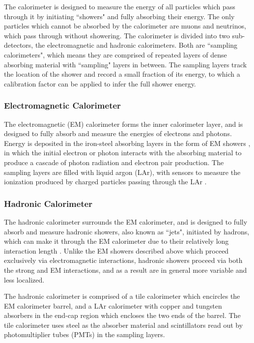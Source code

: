 \documentclass[12pt]{article}
\begin{document}
The calorimeter is designed to measure the energy of all particles which pass through it by initiating ``showers" and fully absorbing their energy. The only particles which cannot be absorbed by the calorimeter are muons and neutrinos, which pass through without showering. The calorimeter is divided into two sub-detectors, the electromagnetic and hadronic calorimeters. Both are ``sampling calorimeters", which means they are comprised of repeated layers of dense absorbing material with ``sampling" layers in between. The sampling layers track the location of the shower and record a small fraction of its energy, to which a calibration factor can be applied to infer the full shower energy. 

\subsubsection{Electromagnetic Calorimeter}

The electromagnetic (EM) calorimeter forms the inner calorimeter layer, and is designed to fully absorb and measure the energies of electrons and photons. Energy is deposited in the iron-steel absorbing layers in the form of EM showers \cite{em_showers}, in which the initial electron or photon interacts with the absorbing material to produce a cascade of photon radiation and electron pair production. The sampling layers are filled with liquid argon (LAr), with sensors to measure the ionization produced by charged particles passing through the LAr \cite{em_cal}. 

\subsubsection{Hadronic Calorimeter}

The hadronic calorimeter surrounds the EM calorimeter, and is designed to fully absorb and measure hadronic showers, also known as ``jets", initiated by hadrons, which can make it through the EM calorimeter due to their relatively long interaction length \cite{atlas}. Unlike the EM showers described above which proceed exclusively via electromagnetic interactions, hadronic showers proceed via both the strong and EM interactions, and as a result are in general more variable and less localized. 

The hadronic calorimeter is comprised of a tile calorimeter which encircles the EM calorimeter barrel, and a LAr calorimeter with copper and tungsten absorbers in the end-cap region which encloses the two ends of the barrel. The tile calorimeter uses steel as the absorber material and scintillators read out by photomultiplier tubes (PMTs) in the sampling layers. 
\end{document}
